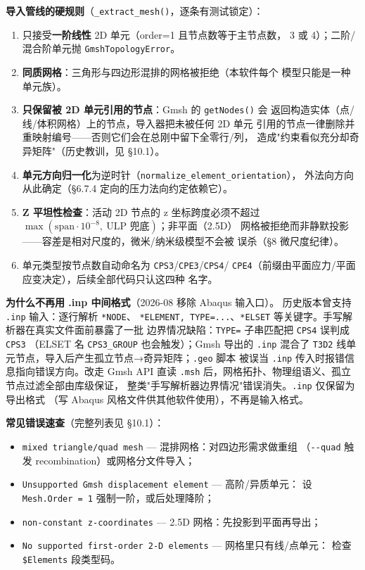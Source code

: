 \documentclass[12pt,a4paper]{ctexart}
\newcommand{\fem}{\Verb}
\begin{document}
\textbf{导入管线的硬规则}（\fem|_extract_mesh()|，逐条有测试锁定）：
\begin{enumerate}
\item 只接受\textbf{一阶线性} 2D 单元（order=1 且节点数等于主节点数，
3 或 4）；二阶/混合阶单元抛 \fem|GmshTopologyError|。
\item \textbf{同质网格}：三角形与四边形混排的网格被拒绝（本软件每个
模型只能是一种单元族）。
\item \textbf{只保留被 2D 单元引用的节点}：Gmsh 的 \fem|getNodes()| 会
返回构造实体（点/线/体积网格）上的节点，导入器把未被任何 2D 单元
引用的节点一律删除并重映射编号——否则它们会在总刚中留下全零行/列，
造成"约束看似充分却奇异矩阵"（历史教训，见 §10.1）。
\item \textbf{单元方向归一化}为逆时针（\fem|normalize_element_orientation|），
外法向方向从此确定（§6.7.4 定向的压力法向约定依赖它）。
\item \textbf{Z 平坦性检查}：活动 2D 节点的 z 坐标跨度必须不超过
$\max(\mathrm{span}\cdot 10^{-8},\ \text{ULP 兜底})$；非平面（2.5D）
网格被拒绝而非静默投影——容差是相对尺度的，微米/纳米级模型不会被
误杀（§8 微尺度纪律）。
\item 单元类型按节点数自动命名为 \fem|CPS3|/\fem|CPE3|/\fem|CPS4|/
\fem|CPE4|（前缀由平面应力/平面应变决定），后续全部代码只认这四种
名字。
\end{enumerate}

\textbf{为什么不再用 .inp 中间格式}（2026-08 移除 Abaqus 输入口）。
历史版本曾支持 \fem|.inp| 输入：逐行解析 \fem|*NODE|、
\fem|*ELEMENT, TYPE=...|、\fem|*ELSET| 等关键字。手写解析器在真实文件面前暴露了一批
边界情况缺陷：\fem|TYPE=| 子串匹配把 \fem|CPS4| 误判成 \fem|CPS3|
（ELSET 名 \fem|CPS3_GROUP| 也会触发）；Gmsh 导出的 \fem|.inp| 混合了
\fem|T3D2| 线单元节点，导入后产生孤立节点→奇异矩阵；\fem|.geo| 脚本
被误当 \fem|.inp| 传入时报错信息指向错误方向。改走 Gmsh API 直读
\fem|.msh| 后，网格拓扑、物理组语义、孤立节点过滤全部由库级保证，
整类"手写解析器边界情况"错误消失。\fem|.inp| 仅保留为导出格式
（写 Abaqus 风格文件供其他软件使用），不再是输入格式。

\textbf{常见错误速查}（完整列表见 §10.1）：
\begin{itemize}
\item \fem|mixed triangle/quad mesh| — 混排网格：对四边形需求做重组
（\fem|--quad| 触发 recombination）或网格分文件导入；
\item \fem|Unsupported Gmsh displacement element| — 高阶/异质单元：
设 \fem|Mesh.Order = 1| 强制一阶，或后处理降阶；
\item \fem|non-constant z-coordinates| — 2.5D 网格：先投影到平面再导出；
\item \fem|No supported first-order 2-D elements| — 网格里只有线/点单元：
检查 \fem|$Elements| 段类型码。
\end{itemize}
\end{document}

